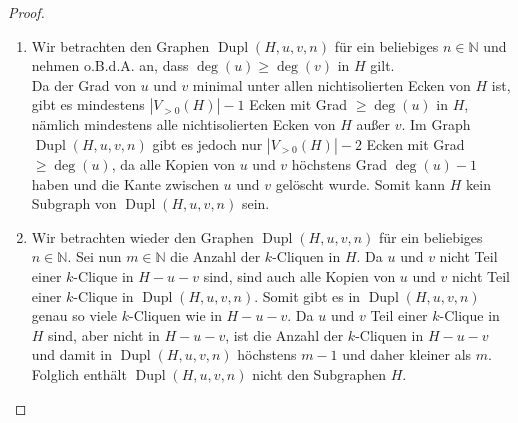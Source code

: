 \documentclass[10pt,a4paper, footheight=1mm, bibliography=totoc]{scrreprt}
\theoremstyle{definition}
\DeclareMathOperator\Dupl{Dupl}
\begin{document}
\begin{proof}
\hfill
\begin{enumerate}[label=\textbf{(\alph*)}, leftmargin=*]
\item      Wir betrachten den Graphen $\Dupl(H,u,v,n)$ für ein
           beliebiges $n\in \mathbb{N}$ und
           nehmen o.B.d.A. an, dass $\deg(u) \geq \deg(v)$ in $H$
           gilt. \\
           Da der Grad von $u$ und $v$ minimal unter allen
           nichtisolierten Ecken von $H$  ist, gibt es
           mindestens $|V_{>0}(H)| - 1$ Ecken mit Grad $\geq \deg(u)$ in $H$,
           nämlich mindestens alle nichtisolierten Ecken von $H$
           außer $v$.
           Im Graph $\Dupl(H,u,v,n)$ gibt es jedoch nur 
           $|V_{>0}(H)|-2$ Ecken mit Grad $\geq \deg(u)$, da alle
           Kopien von $u$ und $v$ höchstens Grad $\deg(u)-1$ haben
           und die Kante zwischen $u$ und $v$ gelöscht wurde.
           Somit kann $H$ kein Subgraph von $\Dupl(H,u,v,n)$ sein.
           
\item      Wir betrachten wieder den Graphen $\Dupl(H,u,v,n)$ für
           ein beliebiges $n\in \mathbb{N}$. Sei nun $m\in \mathbb{N}$
           die Anzahl der $k$-Cliquen in $H$. Da $u$ und $v$ nicht
           Teil einer $k$-Clique in $H-u-v$ sind, sind auch alle
           Kopien von $u$ und $v$ nicht Teil einer $k$-Clique in
           $\Dupl(H,u,v,n)$. Somit gibt es in $\Dupl(H,u,v,n)$ 
           genau so viele $k$-Cliquen wie in $H-u-v$. Da $u$ und
           $v$ Teil einer $k$-Clique in $H$ sind, aber 
           nicht in $H-u-v$, ist die Anzahl der $k$-Cliquen in
           $H-u-v$ und damit in $\Dupl(H,u,v,n)$ höchstens $m-1$
           und daher kleiner als $m$. Folglich enthält $\Dupl(H,u,v,n)$
           nicht den Subgraphen $H$. \qedhere
\end{enumerate}
\end{proof}
\end{document}
